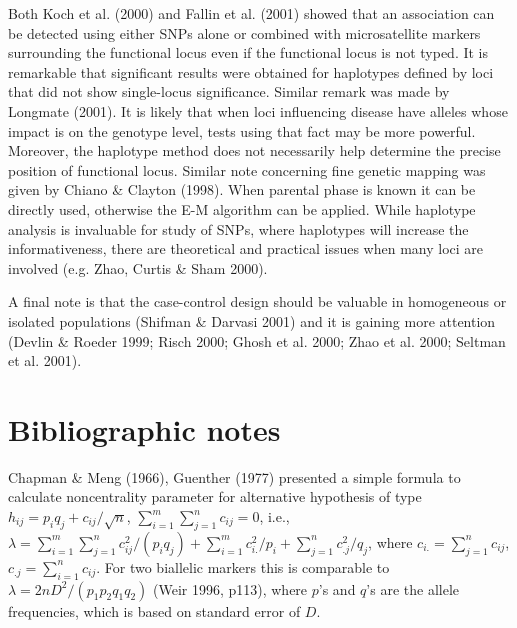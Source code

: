 Both Koch et al.  (2000) and Fallin et al.  (2001) showed that an association
can be detected using either SNPs alone or combined with microsatellite markers
surrounding the functional locus even if the functional locus is not typed.  It
is remarkable that significant results were obtained for haplotypes defined by
loci that did not show single-locus significance.  Similar remark was made by
Longmate (2001).  It is likely that when loci influencing disease have alleles
whose impact is on the genotype level, tests using that fact may be more
powerful.  Moreover, the haplotype method does not necessarily help determine
the precise position of functional locus.  Similar note concerning fine genetic
mapping was given by Chiano \& Clayton (1998).  When parental phase is known it
can be directly used, otherwise the E-M algorithm can be applied.  While
haplotype analysis is invaluable for study of SNPs, where haplotypes will
increase the informativeness, there are theoretical and practical issues when
many loci are involved (e.g.  Zhao, Curtis \& Sham 2000).

A final note is that the case-control design should be valuable in homogeneous
or isolated populations (Shifman \& Darvasi 2001) and it is gaining more
attention (Devlin \& Roeder 1999; Risch 2000; Ghosh et al.  2000; Zhao et al.
2000; Seltman et al.  2001).


\section{Bibliographic notes}

Chapman \& Meng (1966), Guenther (1977) presented a simple formula to calculate
noncentrality parameter for alternative hypothesis of type
$h_{ij}=p_iq_j+c_{ij}/\sqrt{n}$, $\sum_{i=1}^m\sum_{j=1}^nc_{ij}=0$, i.e.,
$\lambda=\sum_{i=1}^m\sum_{j=1}^nc_{ij}^2/(p_iq_j)+\sum_{i=1}^m
c_{i.}^2/p_i+\sum_{j=1}^n c_{.j}^2/q_j$, where $c_{i.}=\sum_{j=1}^nc_{ij}$,
$c_{.j}=\sum_{i=1}^nc_{ij}$.  For two biallelic markers this is comparable to
$\lambda=2nD^2/(p_1p_2q_1q_2)$ (Weir 1996, p113), where $p$'s and $q$'s
are the allele frequencies, which is based on standard error of $D$.

